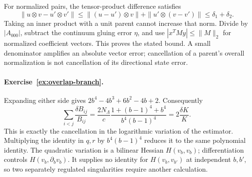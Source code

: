 For normalized pairs, the tensor-product difference satisfies
\[
 \|u\otimes v-u'\otimes v'\|
 \leq\|(u-u')\otimes v\|+
      \|u'\otimes(v-v')\|\leq\delta_1+\delta_2.
\]
Taking an inner product with a unit parent cannot increase that
norm. Divide by $|A_{000}|$, subtract the continuum gluing error
$\eta$, and use $|x^TMy|\leq\|M\|_2$ for normalized coefficient
vectors. This proves the stated bound. A small denominator
amplifies an absolute vector error; cancellation of a parent's
overall normalization is not cancellation of its directional
state error.



\paragraph{Exercise~\ref{ex:overlap-branch}.}
\label{sol:ex:overlap-branch}
Expanding either side gives
$2b^4-4b^3+6b^2-4b+2$. Consequently
\[
 \sum_{i<j}\frac{\delta B_{ij}}{B_{ij}}
 =\frac{2N_\Lambda}{c}
   \frac{1+(b-1)^4+b^4}{b^4(b-1)^4}
 =2\frac{\delta K}{K}.
\]
This is exactly the cancellation in the logarithmic variation
of the estimator. Multiplying the identity in $q,r$ by
$b^4(b-1)^4$ reduces it to the same polynomial identity.
The quadratic variation is a bilinear Hessian $H(v_b,v_b)$;
differentiation controls $H(v_b,\partial_bv_b)$. It supplies
no identity for $H(v_b,v_{b'})$ at independent $b,b'$, so two
separately regulated singularities require another calculation.



